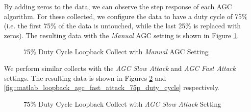 \documentclass{article}
\begin{document}
By adding zeros to the data, we can observe the step response of each AGC algorithm. For these collected, we configure the data to have a duty cycle of 75\% (i.e. the first 75\% of the data is untouched, while the last 25\% is replaced with zeros). The resulting data with the \textit{Manual} AGC setting is shown in Figure \ref{fig::matlab_loopback_agc_manual_75p_duty_cycle}.

\begin{figure}[H]
	\centerline{}
	\caption{75\% Duty Cycle Loopback Collect with \textit{Manual} AGC Setting}
	\label{fig::matlab_loopback_agc_manual_75p_duty_cycle}
\end{figure}

We perform similar collects with the \textit{AGC Slow Attack} and \textit{AGC Fast Attack} settings. The resulting data is shown in Figures \ref{fig::matlab_loopback_agc_slow_attack_75p_duty_cycle} and \ref{fig::matlab_loopback_agc_fast_attack_75p_duty_cycle} respectively.

\begin{figure}[H]
	\centerline{}
	\caption{75\% Duty Cycle Loopback Collect with \textit{AGC Slow Attack} Setting}
	\label{fig::matlab_loopback_agc_slow_attack_75p_duty_cycle}
\end{figure}
\end{document}
